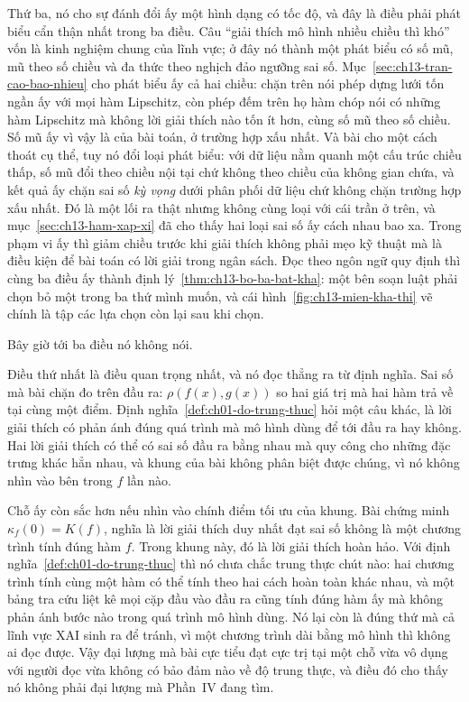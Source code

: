 Thứ ba, nó cho sự đánh đổi ấy một hình dạng có tốc độ, và đây là điều phải phát
biểu cẩn thận nhất trong ba điều. Câu
\enquote{giải thích mô hình nhiều chiều thì khó} vốn là kinh nghiệm chung của
lĩnh vực; ở đây nó thành một phát biểu có số mũ, mũ theo số chiều và đa thức
theo nghịch đảo ngưỡng sai số. Mục~\ref{sec:ch13-tran-cao-bao-nhieu} cho phát
biểu ấy cả hai chiều: chặn trên nói phép dựng lưới tốn ngần ấy với mọi hàm
Lipschitz, còn phép đếm trên họ hàm chóp nói có những hàm Lipschitz mà không lời
giải thích nào tốn ít hơn, cùng số mũ theo số chiều.
Số mũ ấy vì vậy là của bài toán, ở trường hợp xấu nhất. Và bài cho một cách
thoát cụ thể, tuy nó đổi loại phát biểu:
với dữ liệu nằm quanh một cấu trúc chiều thấp, số mũ đổi theo chiều nội tại chứ
không theo chiều của không gian chứa, và kết quả ấy chặn sai số \emph{kỳ vọng}
dưới phân phối dữ liệu chứ không chặn trường hợp xấu nhất. Đó là một lối ra thật
nhưng không cùng loại với cái trần ở trên, và mục~\ref{sec:ch13-ham-xap-xi} đã
cho thấy hai loại sai số ấy cách nhau bao xa. Trong phạm vi ấy thì
giảm chiều trước khi giải thích không phải mẹo kỹ thuật mà là điều kiện để bài
toán có lời giải trong ngân sách. Đọc theo ngôn ngữ quy định thì cùng ba điều ấy
thành định lý~\ref{thm:ch13-bo-ba-bat-kha}: một bên soạn luật phải chọn bỏ một
trong ba thứ mình muốn, và cái hình~\ref{fig:ch13-mien-kha-thi} vẽ chính là tập
các lựa chọn còn lại sau khi chọn.

Bây giờ tới ba điều nó không nói.

%
Điều thứ nhất là điều quan trọng nhất, và nó đọc thẳng ra từ định nghĩa. Sai số
mà bài chặn đo trên đầu ra: $\rho(f(x), g(x))$ so hai giá trị mà hai hàm trả về
tại cùng một điểm. Định nghĩa~\ref{def:ch01-do-trung-thuc} hỏi một câu khác, là
lời giải thích có phản ánh đúng quá trình mà mô hình dùng để tới đầu ra hay
không. Hai lời giải thích có thể có sai số đầu ra bằng nhau mà quy công cho
những đặc trưng khác hẳn nhau, và khung của bài không phân biệt được chúng, vì
nó không nhìn vào bên trong $f$ lần nào.

Chỗ ấy còn sắc hơn nếu nhìn vào chính điểm tối ưu của khung. Bài chứng minh
$\kappa_f(0) = K(f)$, nghĩa là lời giải thích duy nhất đạt sai số không là một
chương trình tính đúng hàm $f$. Trong khung này, đó là lời giải thích hoàn hảo.
Với định nghĩa~\ref{def:ch01-do-trung-thuc} thì nó chưa chắc trung thực chút
nào: hai chương trình tính cùng một hàm có thể tính theo hai cách hoàn toàn khác
nhau, và một bảng tra cứu liệt kê mọi cặp đầu vào đầu ra cũng tính đúng hàm ấy
mà không phản ánh bước nào trong quá trình mô hình dùng. Nó lại còn là đúng thứ
mà cả lĩnh vực XAI sinh ra để tránh, vì một chương trình dài bằng mô hình thì
không ai đọc được. Vậy đại lượng mà bài cực tiểu đạt cực trị tại một chỗ vừa vô
dụng với người đọc vừa không có bảo đảm nào về độ trung thực, và điều đó cho
thấy nó không phải đại lượng mà Phần~IV đang tìm.


